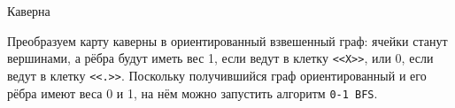 \begin{tutorial}{Каверна}

Преобразуем карту каверны в ориентированный взвешенный граф: ячейки станут вершинами, а рёбра будут иметь вес 1, если ведут в клетку \texttt{<<X>>}, или 0, если ведут в клетку \texttt{<<.>>}. Поскольку получившийся граф ориентированный и его рёбра имеют веса 0 и 1, на нём можно запустить алгоритм \texttt{0-1 BFS}.

\end{tutorial}
